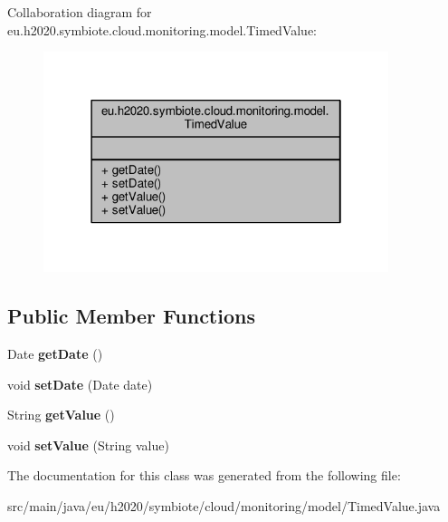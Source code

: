 Collaboration diagram for eu.\+h2020.\+symbiote.\+cloud.\+monitoring.\+model.\+Timed\+Value\+:\nopagebreak
\begin{figure}[H]
\begin{center}
\leavevmode
\includegraphics[width=286pt]{classeu_1_1h2020_1_1symbiote_1_1cloud_1_1monitoring_1_1model_1_1TimedValue__coll__graph}
\end{center}
\end{figure}
\subsection*{Public Member Functions}
\begin{DoxyCompactItemize}
\item 
\mbox{\label{classeu_1_1h2020_1_1symbiote_1_1cloud_1_1monitoring_1_1model_1_1TimedValue_a88925b80b11745ae3b79d1f2a25b827e}} 
Date {\bfseries get\+Date} ()
\item 
\mbox{\label{classeu_1_1h2020_1_1symbiote_1_1cloud_1_1monitoring_1_1model_1_1TimedValue_a7600dad16adeb48f94a3ae8fcf4b7c6f}} 
void {\bfseries set\+Date} (Date date)
\item 
\mbox{\label{classeu_1_1h2020_1_1symbiote_1_1cloud_1_1monitoring_1_1model_1_1TimedValue_a14708e5c4659827e03fb6d1eb079fdd4}} 
String {\bfseries get\+Value} ()
\item 
\mbox{\label{classeu_1_1h2020_1_1symbiote_1_1cloud_1_1monitoring_1_1model_1_1TimedValue_aca1804ef569fc7dd0678b6daef55292e}} 
void {\bfseries set\+Value} (String value)
\end{DoxyCompactItemize}


The documentation for this class was generated from the following file\+:\begin{DoxyCompactItemize}
\item 
src/main/java/eu/h2020/symbiote/cloud/monitoring/model/Timed\+Value.\+java\end{DoxyCompactItemize}
